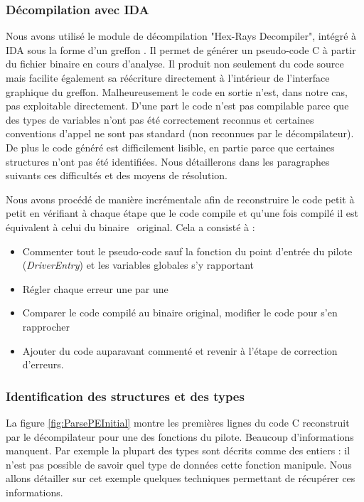 \subsubsection{Décompilation avec IDA}
Nous avons utilisé le module de décompilation "Hex-Rays Decompiler", intégré à IDA sous la forme d’un greffon \cite{IDADecompiler}.
Il permet de générer un pseudo-code C à partir du fichier binaire en cours d’analyse.
Il produit non seulement du code source mais facilite également sa réécriture directement à l’intérieur de l’interface graphique du greffon. 
Malheureusement le code en sortie n’est, dans notre cas, pas exploitable directement. 
D’une part le code n’est pas compilable parce que des types de variables n’ont pas été correctement reconnus et certaines conventions d’appel ne sont pas standard (non reconnues par le décompilateur). 
De plus le code généré est difficilement lisible, en partie parce que certaines structures n’ont pas été identifiées.
Nous détaillerons dans les paragraphes suivants ces difficultés et des moyens de résolution.

Nous avons procédé de manière incrémentale afin de reconstruire le code petit à petit en vérifiant à chaque étape que le code compile et qu'une fois compilé il est équivalent à celui du binaire \driver\ original. 
Cela a consisté à :
\begin{itemize}
 \item Commenter tout le pseudo-code sauf la fonction du point d'entrée du pilote (\emph{DriverEntry}) et les variables globales s'y rapportant
 \item Régler chaque erreur une par une
 \item Comparer le code compilé au binaire original, modifier le code pour s'en rapprocher
 \item Ajouter du code auparavant commenté et revenir à l'étape de correction d'erreurs.
\end{itemize}

\subsubsection{Identification des structures et des types}
La figure \ref{fig:ParsePEInitial} montre les premières lignes du code C reconstruit par le décompilateur pour une des fonctions du pilote.
Beaucoup d'informations manquent. Par exemple la plupart des types sont décrits comme des entiers : il n'est pas possible de savoir quel type de données cette fonction manipule.
Nous allons détailler sur cet exemple quelques techniques permettant de récupérer ces informations.

